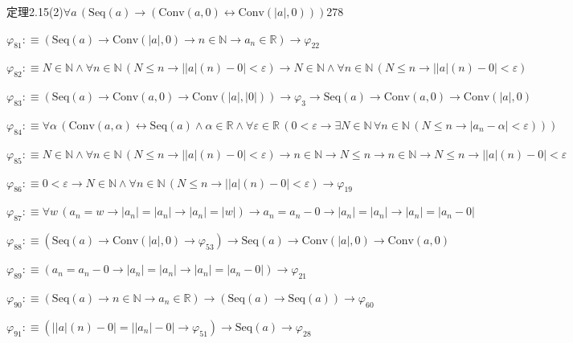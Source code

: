 \begin{fullproof}{定理2.15(2)}{$\forall a\,(\mathrm{Seq}(a) \to (\mathrm{Conv}(a,0) \leftrightarrow \mathrm{Conv}(\lvert a \rvert,0)))$}{278}
\begin{abbrevlist}
\item $\varphi_{81} :\equiv (\mathrm{Seq}(a) \to \mathrm{Conv}(\lvert a \rvert,0) \to n \in \mathbb{N} \to a_{n} \in \mathbb{R}) \to \varphi_{22}$
\item $\varphi_{82} :\equiv N \in \mathbb{N} \land \forall n \in \mathbb{N}\,(N \leq n \to \lvert \lvert a \rvert(n) - 0 \rvert < \varepsilon) \to N \in \mathbb{N} \land \forall n \in \mathbb{N}\,(N \leq n \to \lvert \lvert a \rvert(n) - 0 \rvert < \varepsilon)$
\item $\varphi_{83} :\equiv (\mathrm{Seq}(a) \to \mathrm{Conv}(a,0) \to \mathrm{Conv}(\lvert a \rvert,\lvert 0 \rvert)) \to \varphi_{3} \to \mathrm{Seq}(a) \to \mathrm{Conv}(a,0) \to \mathrm{Conv}(\lvert a \rvert,0)$
\item $\varphi_{84} :\equiv \forall \alpha\,(\mathrm{Conv}(a,\alpha) \leftrightarrow \mathrm{Seq}(a) \land \alpha \in \mathbb{R} \land \forall \varepsilon \in \mathbb{R}\,(0 < \varepsilon \to \exists N \in \mathbb{N}\,\forall n \in \mathbb{N}\,(N \leq n \to \lvert a_{n} - \alpha \rvert < \varepsilon)))$
\item $\varphi_{85} :\equiv N \in \mathbb{N} \land \forall n \in \mathbb{N}\,(N \leq n \to \lvert \lvert a \rvert(n) - 0 \rvert < \varepsilon) \to n \in \mathbb{N} \to N \leq n \to n \in \mathbb{N} \to N \leq n \to \lvert \lvert a \rvert(n) - 0 \rvert < \varepsilon$
\item $\varphi_{86} :\equiv 0 < \varepsilon \to N \in \mathbb{N} \land \forall n \in \mathbb{N}\,(N \leq n \to \lvert \lvert a \rvert(n) - 0 \rvert < \varepsilon) \to \varphi_{19}$
\item $\varphi_{87} :\equiv \forall w\,(a_{n} = w \to \lvert a_{n} \rvert = \lvert a_{n} \rvert \to \lvert a_{n} \rvert = \lvert w \rvert) \to a_{n} = a_{n} - 0 \to \lvert a_{n} \rvert = \lvert a_{n} \rvert \to \lvert a_{n} \rvert = \lvert a_{n} - 0 \rvert$
\item $\varphi_{88} :\equiv (\mathrm{Seq}(a) \to \mathrm{Conv}(\lvert a \rvert,0) \to \varphi_{53}) \to \mathrm{Seq}(a) \to \mathrm{Conv}(\lvert a \rvert,0) \to \mathrm{Conv}(a,0)$
\item $\varphi_{89} :\equiv (a_{n} = a_{n} - 0 \to \lvert a_{n} \rvert = \lvert a_{n} \rvert \to \lvert a_{n} \rvert = \lvert a_{n} - 0 \rvert) \to \varphi_{21}$
\item $\varphi_{90} :\equiv (\mathrm{Seq}(a) \to n \in \mathbb{N} \to a_{n} \in \mathbb{R}) \to (\mathrm{Seq}(a) \to \mathrm{Seq}(a)) \to \varphi_{60}$
\item $\varphi_{91} :\equiv (\lvert \lvert a \rvert(n) - 0 \rvert = \lvert \lvert a_{n} \rvert - 0 \rvert \to \varphi_{51}) \to \mathrm{Seq}(a) \to \varphi_{28}$

\end{abbrevlist}
\end{fullproof}
